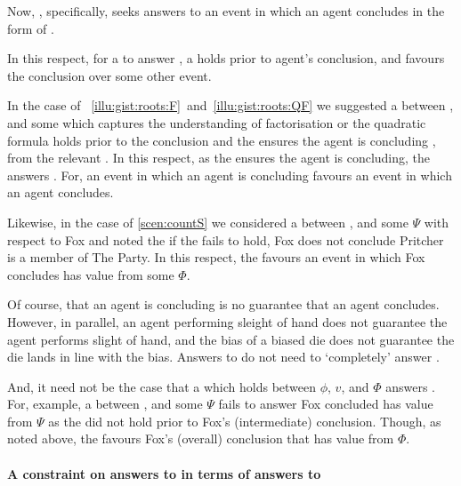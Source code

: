 \begin{note}
  Now, \qWhy{}, specifically, seeks answers to an event in which an agent concludes in the form of .

  In this respect, for a \ros{} to answer \qWhy{}, a \ros{} holds prior to agent's conclusion, and favours the conclusion over some other event.

  In the case of ~\ref{illu:gist:roots:F}~and~\ref{illu:gist:roots:QF} we suggested a \ros{} between \propM{\rootsCon{}},  and some \pool{} which captures the \agents{} understanding of factorisation or the quadratic formula holds prior to the \agents{} conclusion and the \ros{} ensures the agent is concluding \propM{\rootsCon{}},  from the relevant \pool{}.
  In this respect, as the \ros{} ensures the agent is concluding, the \ros{} answers \qWhy{}.
  For, an event in which an agent is concluding favours an event in which an agent concludes.

  Likewise, in the case of \autoref{scen:countS} we considered a \ros{} between ,  and some \pool{} \(\Psi\) with respect to Fox and noted the if the \ros{} fails to hold, Fox does not conclude Pritcher is a member of The Party.
  In this respect, the \ros{} favours an event in which Fox concludes  has value  from some \pool{} \(\Phi\).

  Of course, that an agent is concluding is no guarantee that an agent concludes.
  However, in parallel, an agent performing sleight of hand does not guarantee the agent performs slight of hand, and the bias of a biased die does not guarantee the die lands in line with the bias.
  Answers to \qWhy{} do not need to `completely' answer \qWhy{}.

  And, it need not be the case that a \ros{} which holds between \(\phi\), \(v\), and \(\Phi\) answers \qWhy{}.
  For, example, a \ros{} between ,  and some \pool{} \(\Psi\) fails to answer \qWhy{} Fox concluded  has value  from \(\Psi\) as the \ros{} did not hold prior to Fox's (intermediate) conclusion.
  Though, as noted above, the \ros{} favours Fox's (overall) conclusion that  has value  from \(\Phi\).
\end{note}



\paragraph*{A constraint on answers to \qWhy{} in terms of answers to \qHow{}}


